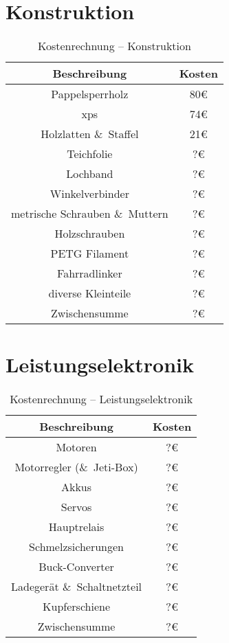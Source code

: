 \section{Konstruktion}
\begin{table}[H]
    \centering
    \begin{tabular}{|c|c|}
        \hline
        \textbf{Beschreibung} & \textbf{Kosten}\\\hline
        Pappelsperrholz & 80\euro\\
        \acs{xps} & 74\euro\\
        Holzlatten \&\ Staffel & 21\euro\\
        Teichfolie & ?\euro\\
        Lochband & ?\euro\\
        Winkelverbinder & ?\euro\\
        metrische Schrauben \&\ Muttern & ?\euro\\
        Holzschrauben & ?\euro\\
        PETG Filament & ?\euro\\
        Fahrradlinker & ?\euro\\
        diverse Kleinteile & ?\euro\\
        \hline
        Zwischensumme & ?\euro\\\hline
    \end{tabular}
    \caption{Kostenrechnung -- Konstruktion}
\end{table}

\section{Leistungselektronik}
\begin{table}[H]
    \centering
    \begin{tabular}{|c|c|}
        \hline
        \textbf{Beschreibung} & \textbf{Kosten}\\\hline
        Motoren & ?\euro\\
        Motorregler (\&\ Jeti-Box)& ?\euro\\
        Akkus & ?\euro\\
        Servos & ?\euro\\
        Hauptrelais & ?\euro\\
        Schmelzsicherungen & ?\euro\\
        Buck-Converter & ?\euro\\
        Ladegerät \&\ Schaltnetzteil & ?\euro\\
        Kupferschiene & ?\euro\\
        \hline
        Zwischensumme & ?\euro\\\hline
    \end{tabular}
    \caption{Kostenrechnung -- Leistungselektronik}
\end{table}

